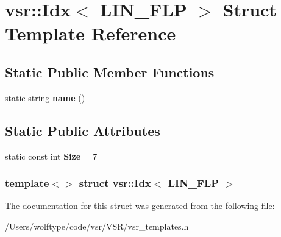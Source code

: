 \hypertarget{structvsr_1_1_idx_3_01_l_i_n___f_l_p_01_4}{\section{vsr\-:\-:Idx$<$ L\-I\-N\-\_\-\-F\-L\-P $>$ Struct Template Reference}
\label{structvsr_1_1_idx_3_01_l_i_n___f_l_p_01_4}
}
\subsection*{Static Public Member Functions}
\begin{DoxyCompactItemize}
\item 
\hypertarget{structvsr_1_1_idx_3_01_l_i_n___f_l_p_01_4_ab7bde61119513c46a26f3543713e689d}{static string {\bfseries name} ()}\label{structvsr_1_1_idx_3_01_l_i_n___f_l_p_01_4_ab7bde61119513c46a26f3543713e689d}

\end{DoxyCompactItemize}
\subsection*{Static Public Attributes}
\begin{DoxyCompactItemize}
\item 
\hypertarget{structvsr_1_1_idx_3_01_l_i_n___f_l_p_01_4_ae537e95a893b6f0023a4bcf42a920622}{static const int {\bfseries Size} = 7}\label{structvsr_1_1_idx_3_01_l_i_n___f_l_p_01_4_ae537e95a893b6f0023a4bcf42a920622}

\end{DoxyCompactItemize}
\subsubsection*{template$<$$>$ struct vsr\-::\-Idx$<$ L\-I\-N\-\_\-\-F\-L\-P $>$}



The documentation for this struct was generated from the following file\-:\begin{DoxyCompactItemize}
\item 
/\-Users/wolftype/code/vsr/\-V\-S\-R/vsr\-\_\-templates.\-h\end{DoxyCompactItemize}
